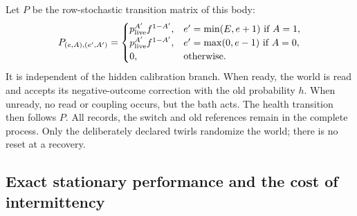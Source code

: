 \documentclass[11pt,a4paper]{article}
\begin{document}
Let $P$ be the row-stochastic transition matrix of this body:
\[
 P_{(e,A),(e',A')}=
 \begin{cases}
 p_{\rm live}^{A'}f^{1-A'},&
 e'=\min(E,e+1)\ \text{if }A=1,\\
 p_{\rm live}^{A'}f^{1-A'},&
 e'=\max(0,e-1)\ \text{if }A=0,\\
 0,&\text{otherwise}.
 \end{cases}
\]
It is independent of the hidden calibration branch. When ready,
the world is read and accepts its negative-outcome correction with
the old probability $h$. When unready, no read or coupling occurs,
but the bath acts. The health transition then follows $P$.
All records, the switch and old references remain in the complete
process. Only the deliberately declared twirls randomize the world;
there is no reset at a recovery.

\subsection{Exact stationary performance and the cost of intermittency}
\end{document}
